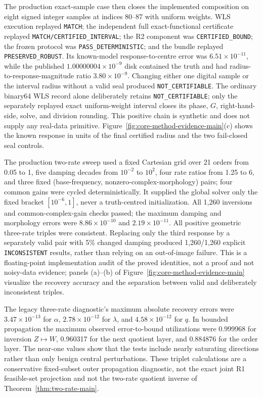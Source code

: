 \documentclass[11pt]{article}
\theoremstyle{definition}
\theoremstyle{remark}
\newcommand{\status}[1]{\texttt{#1}}
\begin{document}
The production exact-sample case then closes the implemented composition on
eight signed integer samples at indices 80--87 with uniform weights.  WLS
execution replayed \status{MATCH}; the independent full exact-functional
certificate replayed \status{MATCH/CERTIFIED\_INTERVAL}; the R2 component was
\status{CERTIFIED\_BOUND}; the frozen protocol was
\status{PASS\_DETERMINISTIC}; and the bundle replayed
\status{PRESERVED\_ROBUST}.  Its known-model response-to-centre error was
$6.51\times10^{-11}$, while the published $1.00000004\times10^{-9}$ disk
contained the truth and had radius-to-response-magnitude ratio
$3.80\times10^{-9}$.  Changing either one digital sample or the interval
radius without a valid seal produced \status{NOT\_CERTIFIABLE}.  The ordinary
binary64 WLS record alone deliberately retains
\status{NOT\_CERTIFIABLE}; only the separately replayed exact uniform-weight
interval closes its phase, $G$, right-hand-side, solve, and division rounding.
This positive chain is synthetic and does not supply any real-data primitive.
Figure~\ref{fig:core-method-evidence-main}(c) shows the known response in units
of the final certified radius and the two fail-closed seal controls.

The production two-rate sweep used a fixed Cartesian grid over 21 orders from
0.05 to 1, five damping decades from $10^{-2}$ to $10^2$, four rate ratios
from 1.25 to 6, and three fixed (base-frequency, nonzero-complex-morphology)
pairs; four common gains were cycled deterministically.  It supplied the
global solver only the fixed bracket
$[10^{-6},1]$, never a truth-centred initialization.  All 1,260 inversions and
common-complex-gain checks passed; the maximum damping and morphology errors
were $8.86\times10^{-10}$ and $2.19\times10^{-11}$.  All positive geometric
three-rate triples were consistent.  Replacing only the third response by a
separately valid pair with 5\% changed damping produced 1,260/1,260 explicit
\status{INCONSISTENT} results, rather than relying on an out-of-image failure.
This is a floating-point implementation audit of the proved identities, not a
proof and not noisy-data evidence; panels (a)--(b) of
Figure~\ref{fig:core-method-evidence-main} visualize the recovery accuracy and
the separation between valid and deliberately inconsistent triples.

The legacy three-rate diagnostic's maximum absolute recovery errors were
$3.47\times10^{-13}$ for $\alpha$, $2.78\times10^{-12}$ for $\lambda$, and
$4.58\times10^{-12}$ for $q$.  In bounded propagation the maximum observed
error-to-bound utilizations were 0.999968 for inversion $Z\mapsto W$, 0.960317
for the next quotient layer, and 0.884876 for the order layer.  The near-one
values show that the tests include nearly saturating directions rather than
only benign central perturbations.  These triplet calculations are a
conservative fixed-subset outer propagation diagnostic, not the exact joint
R1 feasible-set projection and not the two-rate quotient inverse of
Theorem~\ref{thm:two-rate-main}.
\end{document}
